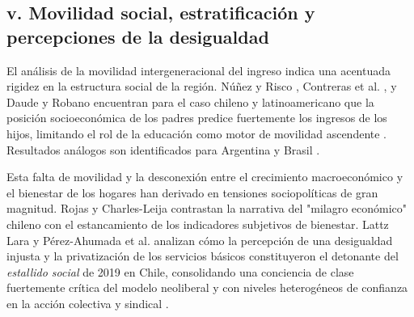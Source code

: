 \subsection{v. Movilidad social, estratificación y percepciones de la desigualdad}

El análisis de la movilidad intergeneracional del ingreso indica una acentuada rigidez en la estructura social de la región. Núñez y Risco \parencite*{NunezRisco2004}, Contreras et al. \parencite*{Contrerasetal2014}, y Daude y Robano \parencite*{DaudeRobano2015} encuentran para el caso chileno y latinoamericano que la posición socioeconómica de los padres predice fuertemente los ingresos de los hijos, limitando el rol de la educación como motor de movilidad ascendente \parencite{Contrerasetal2014}. Resultados análogos son identificados para Argentina \parencite{BeccariaGroisman2008} y Brasil \parencite{CostaRibeiroCarcalhaes2024}.

Esta falta de movilidad y la desconexión entre el crecimiento macroeconómico y el bienestar de los hogares han derivado en tensiones sociopolíticas de gran magnitud. Rojas y Charles-Leija \parencite*{RojasCharlesLeija2022} contrastan la narrativa del "milagro económico" chileno con el estancamiento de los indicadores subjetivos de bienestar. Lattz Lara \parencite*{LattzLara2026} y Pérez-Ahumada et al. \parencite*{Perez-Ahumadaetal2026} analizan cómo la percepción de una desigualdad injusta y la privatización de los servicios básicos constituyeron el detonante del \textit{estallido social} de 2019 en Chile, consolidando una conciencia de clase fuertemente crítica del modelo neoliberal y con niveles heterogéneos de confianza en la acción colectiva y sindical \parencite{Perez-AhumadaCarrasco2025}.